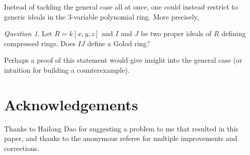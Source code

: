 \documentclass[10pt]{amsart}
\theoremstyle{definition}
\theoremstyle{remark}
\newtheorem{the context}[theorem]{The Context}
\newtheorem{question}[theorem]{Question}
\numberwithin{equation}{theorem}
\numberwithin{equation}{section}
\begin{document}
Instead of tackling the general case all at once, one could instead restrict to generic ideals in the $3$-variable polynomial ring. More precisely,

\begin{question}
Let $R = k[x,y,z]$ and $I$ and $J$ be two proper ideals of $R$ defining compressed rings. Does $IJ$ define a Golod ring?
\end{question}

Perhaps a proof of this statement would give insight into the general case (or intuition for building a counterexample).

\section*{Acknowledgements}

Thanks to Hailong Dao for suggesting a problem to me that resulted in this paper, and thanks to the anonymous referee for multiple improvements and corrections.




\end{document}
